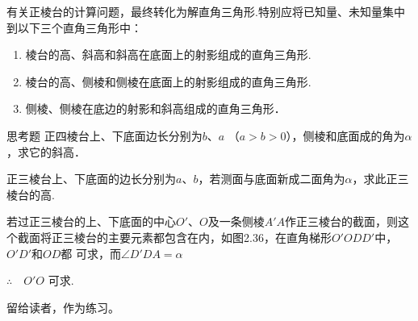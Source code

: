 \begin{remark}
有关正棱台的计算问题，最终转化为解直角三角形.特别应将已知量、未知量集中到以下三个直角三角形中：
\begin{enumerate}
\item 棱台的高、斜高和斜高在底面上的射影组成的直角三角形.
\item 棱台的高、侧棱和侧棱在底面上的射影组成的直角三角形.
\item 侧棱、侧棱在底边的射影和斜高组成的直角三角形．
\end{enumerate}
\end{remark}

\begin{thm}
   {思考题} 正四棱台上、下底面边长分别为$b$、$a$ （$a>b>0$），侧棱和底面成的角为$\alpha$，求它的斜高． 
\end{thm}

\begin{example}
    正三棱台上、下底面的边长分别为$a$、$b$，若测面与底面新成二面角为$\alpha$，求此正三棱台的高.
\end{example}

\noindent
\begin{minipage}{.58\textwidth}\CTEXindent
\begin{analyze}
   若过正三棱台的上、下底面的中心$O'$、$O$及一条侧棱$A'A$作正三棱台的截面，则这个截面将正三棱台的主要元素都包含在内，如图2.36，在直角梯形$O'ODD'$中，$O'D'$和$OD$都
    可求，而$\angle D'DA=\alpha$

$\therefore\quad O'O$ 可求.
\end{analyze}


\end{minipage}
\hfill
\begin{minipage}{.4\textwidth}
\centering
{}
\end{minipage}

\begin{solution}
留给读者，作为练习。
\end{solution}

